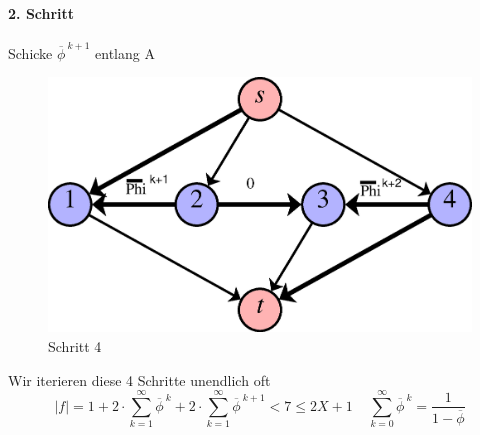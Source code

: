 \paragraph{2. Schritt} Schicke $\overline{\phi}^{~k+1}$ entlang A
\begin{figure}[H]
\centering
\includegraphics[width=0.3\linewidth]{25/Grafik/Schritt4}
\caption{Schritt 4}
\label{fig:Schritt4}
\end{figure}

Wir iterieren diese 4 Schritte unendlich oft
\[ |f| = 1+2\cdot\sum_{k=1}^{\infty}\overline{\phi}^{~k}+2\cdot\sum_{k=1}^{\infty}\overline{\phi}^{~k+1}<7\leq 2X+1~~~~~\sum_{k=0}^{\infty}\overline{\phi}^{~k}=\frac{1}{1-\overline{\phi}} \]